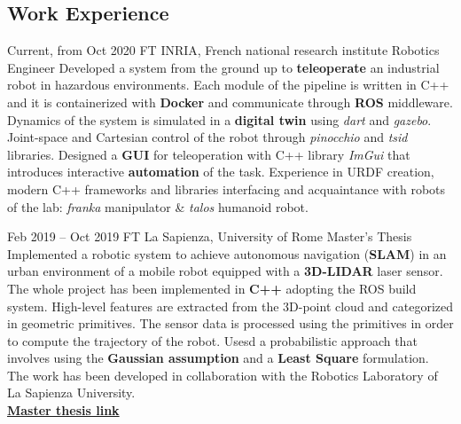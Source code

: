 \documentclass[
	12pt, %
]{../templates/FreemanCV}
\begin{document}
\newpage
\begin{paracol}{2} %

\section{Work Experience}





\jobentry
	{Current, from Oct 2020} %
	{FT} %
        {INRIA, French national research institute} %
	{Robotics Engineer} %
	{
          Developed a system from the ground up to \textbf{teleoperate} an industrial robot in hazardous environments.
          Each module of the pipeline is written in C++ and it is containerized with \textbf{Docker} and communicate through \textbf{ROS} middleware.
          Dynamics of the system is simulated in a \textbf{digital twin} using \textit{dart} and \textit{gazebo}.
          Joint-space and Cartesian control of the robot through \textit{pinocchio} and \textit{tsid} libraries.
          Designed a \textbf{GUI} for teleoperation with C++ library \textit{ImGui} that introduces interactive \textbf{automation} of the task.
          Experience in URDF creation, modern C++ frameworks and libraries interfacing and
          acquaintance with robots of the lab: \textit{franka}  manipulator \& \textit{talos} humanoid robot.
        }

\jobentry
	{Feb 2019 -- Oct 2019} %
	{FT} %
	{La Sapienza, University of Rome} %
	{Master's Thesis} %
        {Implemented a robotic system to achieve autonomous navigation (\textbf{SLAM}) in an urban environment of a mobile robot equipped with a \textbf{3D-LIDAR} laser sensor.
         The whole project has been implemented in \textbf{C++} adopting the ROS build system.
         High-level features are extracted from the 3D-point cloud and categorized in geometric primitives.
         The sensor data is processed using the primitives in order to compute the trajectory of the robot.
         Usesd a probabilistic approach that involves using the \textbf{Gaussian assumption} and a \textbf{Least Square} formulation.
         The work has been developed in collaboration with the Robotics Laboratory of La Sapienza University.\\
         \href{https://github.com/dinies/MasterThesis-ArtificialIntelligence-Robotics/blob/master/MaterThesis_Edoardo_Ghini.pdf}{\textbf{Master thesis link}}
         }


\end{paracol}
\end{document}
